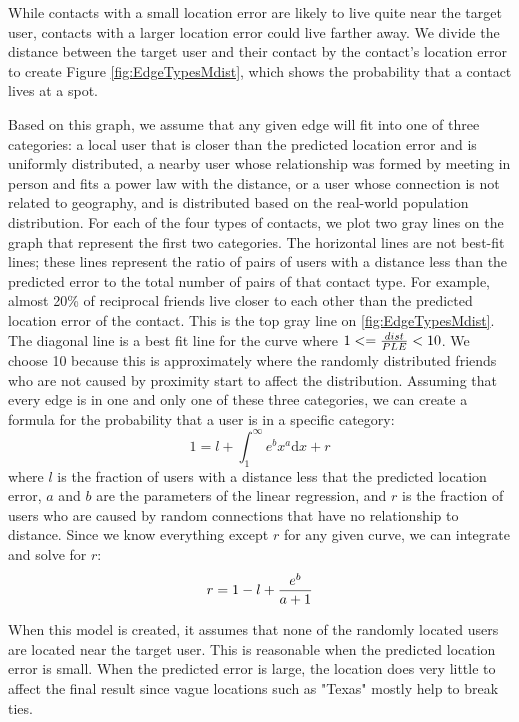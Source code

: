 \documentclass{sig-alternate}
\begin{document}
While contacts with a small location error are likely to live quite near the target user, contacts with a larger location error could live farther away. 
We divide the distance between the target user and their contact by the contact's location error to create Figure \ref{fig:EdgeTypesMdist}, which shows the probability that a contact lives at a spot.

Based on this graph, we assume that any given edge will fit into one of three categories: a local user that is closer than the predicted location error and is uniformly distributed, a nearby user whose relationship was formed by meeting in person and fits a power law with the distance, or a user whose connection is not related to geography, and is distributed based on the real-world population distribution.
For each of the four types of contacts, we plot two gray lines on the graph that represent the first two categories.
The horizontal lines are not best-fit lines; these lines represent the ratio of pairs of users with a distance less than the predicted error to the total number of pairs of that contact type. 
For example, almost 20\% of reciprocal friends live closer to each other than
the predicted location error of the contact. This is the top gray line on
\ref{fig:EdgeTypesMdist}.
The diagonal line is a best fit line for the curve where
\begin{math}1<={dist \over PLE}<10\end{math}.
We choose 10 because this is approximately where the randomly distributed friends who are not caused by proximity start to affect the distribution.
Assuming that every edge is in one and only one of these three categories, we can create a formula for the probability that a user is in a specific category:
\begin{displaymath}1=l+\int_{1}^{\infty}e^{b}x^{a}\mathrm{d}x+r\end{displaymath}
where \(l\) is the fraction of users with a distance less that the predicted
location error, \(a\) and \(b\) are the parameters of the linear regression,
and \(r\) is the fraction of users who are caused by random connections that
have no relationship to distance. Since we know everything except \(r\) for any given curve, we can integrate and solve for \(r\):
\begin{displaymath}r=1-l+{e^{b} \over a+1}\end{displaymath}

When this model is created, it assumes that none of the randomly located users are located near the target user. This is reasonable when the predicted location error is small. When the predicted error is large, the location does very little to affect the final result since vague locations such as "Texas" mostly help to break ties.
\end{document}

